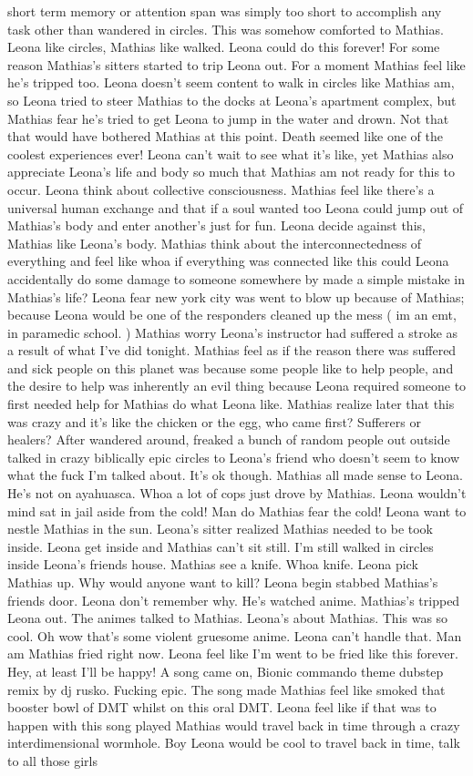 \documentclass[12pt]{book}
\begin{document}
short term memory or attention span was simply too short to accomplish any task other than wandered in circles. This was somehow comforted to Mathias. Leona like circles, Mathias like walked. Leona could do this forever! For some reason Mathias's sitters started to trip Leona out. For a moment Mathias feel like he's tripped too. Leona doesn't seem content to walk in circles like Mathias am, so Leona tried to steer Mathias to the docks at Leona's apartment complex, but Mathias fear he's tried to get Leona to jump in the water and drown. Not that that would have bothered Mathias at this point. Death seemed like one of the coolest experiences ever! Leona can't wait to see what it's like, yet Mathias also appreciate Leona's life and body so much that Mathias am not ready for this to occur. Leona think about collective consciousness. Mathias feel like there's a universal human exchange and that if a soul wanted too Leona could jump out of Mathias's body and enter another's just for fun. Leona decide against this, Mathias like Leona's body. Mathias think about the interconnectedness of everything and feel like whoa if everything was connected like this could Leona accidentally do some damage to someone somewhere by made a simple mistake in Mathias's life? Leona fear new york city was went to blow up because of Mathias; because Leona would be one of the responders cleaned up the mess ( im an emt, in paramedic school. ) Mathias worry Leona's instructor had suffered a stroke as a result of what I've did tonight. Mathias feel as if the reason there was suffered and sick people on this planet was because some people like to help people, and the desire to help was inherently an evil thing because Leona required someone to first needed help for Mathias do what Leona like. Mathias realize later that this was crazy and it's like the chicken or the egg, who came first? Sufferers or healers? After wandered around, freaked a bunch of random people out outside talked in crazy biblically epic circles to Leona's friend who doesn't seem to know what the fuck I'm talked about. It's ok though. Mathias all made sense to Leona. He's not on ayahuasca. Whoa a lot of cops just drove by Mathias. Leona wouldn't mind sat in jail aside from the cold! Man do Mathias fear the cold! Leona want to nestle Mathias in the sun. Leona's sitter realized Mathias needed to be took inside. Leona get inside and Mathias can't sit still. I'm still walked in circles inside Leona's friends house. Mathias see a knife. Whoa knife. Leona pick Mathias up. Why would anyone want to kill? Leona begin stabbed Mathias's friends door. Leona don't remember why. He's watched anime. Mathias's tripped Leona out. The animes talked to Mathias. Leona's about Mathias. This was so cool. Oh wow that's some violent gruesome anime. Leona can't handle that. Man am Mathias fried right now. Leona feel like I'm went to be fried like this forever. Hey, at least I'll be happy! A song came on, Bionic commando theme dubstep remix by dj rusko. Fucking epic. The song made Mathias feel like smoked that booster bowl of DMT whilst on this oral DMT. Leona feel like if that was to happen with this song played Mathias would travel back in time through a crazy interdimensional wormhole. Boy Leona would be cool to travel back in time, talk to all those girls 
\end{document}
